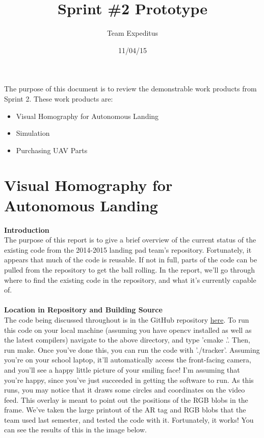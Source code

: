 \documentclass[11pt]{book}
\title{Sprint \#2 Prototype}
\date{11/04/15}
\author{Team Expeditus}
\begin{document}
\maketitle
\noindent The purpose of this document is to review the demonstrable work products from Sprint 2. These work products are:
\begin{itemize}
\item Visual Homography for Autonomous Landing
\item Simulation
\item Purchasing UAV Parts 
\end{itemize}

\section*{Visual Homography for Autonomous Landing}
\large{\textbf{Introduction}}\\
\normalsize
\noindent The purpose of this report is to give a brief overview of the current status of the existing code from the 2014-2015 landing pad team's repository. Fortunately, it appears that much of the code is reusable. If not in full, parts of the code can be pulled from the repository to get the ball rolling. In the report, we'll go through where to find the existing code in the repository, and what it's currently capable of.\\
\vspace{2mm}\\
\noindent\large{\textbf{Location in Repository and Building Source}}\\
\normalsize
\noindent The code being discussed throughout is in the GitHub repository \href{https://github.com/SDSMT-CSC464-F15/landingpad/tree/master/2014-2015/led}{here}. To run this code on your local machine (assuming you have opencv installed as well as the latest compilers) navigate to the above directory, and type 'cmake .'. Then, run make. Once you've done this, you can run the code with './tracker'. Assuming you're on your school laptop, it'll automatically access the front-facing camera, and you'll see a happy little picture of your smiling face! I'm assuming that you're happy, since you've just succeeded in getting the software to run. As this runs, you may notice that it draws some circles and coordinates on the video feed. This overlay is meant to point out the positions of the RGB blobs in the frame. We've taken the large printout of the AR tag and RGB blobs that the team used last semester, and tested the code with it. Fortunately, it works! You can see the results of this in the image below.\\
	
\end{document}
